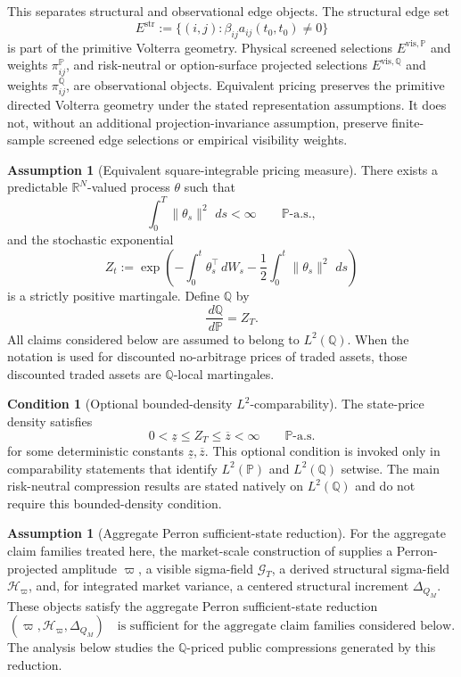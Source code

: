 \documentclass[11pt,a4paper]{amsart}
\theoremstyle{plain}
\theoremstyle{definition}
\newtheorem{assumption}[theorem]{Assumption}
\newtheorem{condition}[theorem]{Condition}
\theoremstyle{remark}
\newcommand{\R}{\mathbb{R}}
\newcommand{\PP}{\mathbb{P}}
\newcommand{\QQ}{\mathbb{Q}}
\newcommand{\cG}{\mathcal{G}}
\newcommand{\cH}{\mathcal{H}}
\newcommand{\dd}{\,d}
\begin{document}
This separates structural and observational edge objects.  The structural edge set
\[
        E^{\mathrm{str}}
        :=
        \{(i,j):\beta_{ij}a_{ij}(t_0,t_0)\ne0\}
\]
is part of the primitive Volterra geometry.  Physical screened selections
\(E^{\mathrm{vis},\PP}\) and weights \(\pi_{ij}^{\PP}\), and risk-neutral or option-surface
projected selections \(E^{\mathrm{vis},\QQ}\) and weights \(\pi_{ij}^{\QQ}\), are observational
objects.  Equivalent pricing preserves the primitive directed Volterra geometry under the stated
representation assumptions.  It does not, without an additional projection-invariance assumption,
preserve finite-sample screened edge selections or empirical visibility weights.

\begin{assumption}[Equivalent square-integrable pricing measure]\label{ass:q}
There exists a predictable \(\R^N\)-valued process \(\theta\) such that
\[
        \int_0^T \|\theta_s\|^2\,\dd s < \infty
        \qquad \PP\text{-a.s.},
\]
and the stochastic exponential
\[
        Z_t
        :=
        \exp\!\left(
                -\int_0^t \theta_s^\top \dd W_s
                - \frac12 \int_0^t \|\theta_s\|^2\,\dd s
        \right)
\]
is a strictly positive martingale.  Define \(\QQ\) by
\[
        \frac{\dd\QQ}{\dd\PP}=Z_T.
\]
All claims considered below are assumed to belong to \(L^2(\QQ)\).  When the notation is used for
discounted no-arbitrage prices of traded assets, those discounted traded assets are
\(\QQ\)-local martingales.
\end{assumption}

\begin{condition}[Optional bounded-density \(L^2\)-comparability]\label{ass:q-bounds}
The state-price density satisfies
\[
        0<\underline z \le Z_T \le \overline z<\infty
        \qquad \PP\text{-a.s.}
\]
for some deterministic constants \(\underline z,\overline z\).
This optional condition is invoked only in comparability statements that identify \(L^2(\PP)\)
and \(L^2(\QQ)\) setwise.  The main risk-neutral compression results are stated natively on
\(L^2(\QQ)\) and do not require this bounded-density condition.
\end{condition}

\begin{assumption}[Aggregate Perron sufficient-state reduction]\label{ass:aggregate-perron-bridge}
For the aggregate claim families treated here, the market-scale construction of \cite{vidal2026market}
supplies a Perron-projected amplitude \(\varpi\), a visible sigma-field \(\cG_T\), a derived
structural sigma-field \(\cH_\varpi\), and, for integrated market variance, a centered structural
increment \(\Delta_{Q_M}\).  These objects satisfy the aggregate Perron sufficient-state reduction
\[
        (\varpi,\cH_\varpi,\Delta_{Q_M})
        \quad\text{is sufficient for the aggregate claim families considered below.}
\]
The analysis below studies the \(\QQ\)-priced public compressions generated by this reduction.
\end{assumption}
\end{document}
